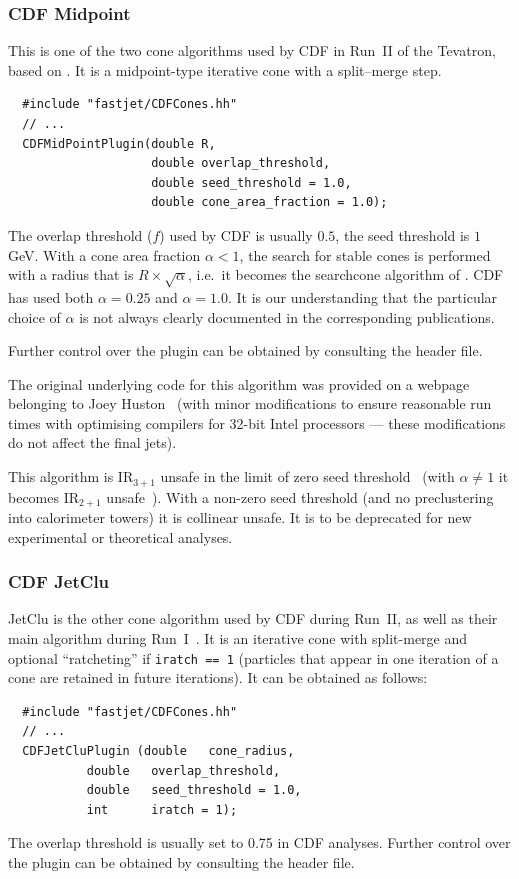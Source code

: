 \documentclass[12pt,a4]{article}
\newcommand{\ttt}[1]{{\small\texttt{#1}}}
\begin{document}
\subsubsection{CDF Midpoint} 
%
This is one of the two cone algorithms used by CDF in Run~II of the Tevatron, based
on \cite{RunII-jet-physics}. It is a midpoint-type iterative cone with
a split--merge step.
%
\begin{lstlisting}
  #include "fastjet/CDFCones.hh"
  // ...
  CDFMidPointPlugin(double R, 
                    double overlap_threshold,
                    double seed_threshold = 1.0, 
                    double cone_area_fraction = 1.0);
\end{lstlisting}
The overlap threshold ($f$) used by CDF is usually $0.5$, the seed
threshold is $1$\,GeV. 
%
With a cone area fraction $\alpha < 1$, the search for stable
cones is performed with a radius that is $R \times
\sqrt{\alpha}$, i.e.\ it becomes the searchcone
algorithm of \cite{EHT}.
%
CDF has used both $\alpha = 0.25$ and $\alpha = 1.0$.
%
It is our understanding that the particular choice of $\alpha$ is not
always clearly documented in the corresponding publications.

Further control over the plugin can be obtained by consulting the
header file.

The original underlying code for this algorithm was provided on a
webpage belonging to Joey Huston~\cite{CDFCones} (with minor
modifications to ensure reasonable run times with optimising compilers
for 32-bit Intel processors --- these modifications do not affect the
final jets).

This algorithm is IR$_{3+1}$ unsafe in the limit of zero seed
threshold~\cite{SISCone} (with $\alpha \neq 1$ it
becomes IR$_{2+1}$ unsafe~\cite{TeV4LHC}).
%
With a non-zero seed threshold (and no preclustering into calorimeter
towers) it is collinear unsafe.
%
It is to be
deprecated for new experimental or theoretical analyses.

\subsubsection{CDF JetClu}

JetClu is the other cone algorithm used by CDF during Run~II, as well
as their main algorithm during Run~I~\cite{Abe:1991ui}. 
%
It is an iterative cone with split-merge and optional ``ratcheting''
if \ttt{iratch == 1} (particles that appear in one iteration of a cone
are retained in future iterations).
%
It can be obtained as follows:
\begin{lstlisting}
  #include "fastjet/CDFCones.hh"
  // ...
  CDFJetCluPlugin (double   cone_radius, 
		   double   overlap_threshold, 
		   double   seed_threshold = 1.0,
		   int      iratch = 1);
\end{lstlisting}
%
The overlap threshold is usually set to 0.75 in CDF analyses.
%
Further control over the plugin can be obtained by consulting the
header file.
\end{document}
